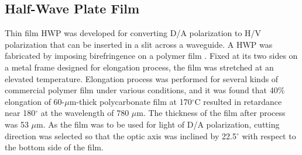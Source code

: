 \documentclass[letterpaper, 10pt]{article}
\begin{document}


\subsection{Half-Wave Plate Film}
Thin film HWP was developed for converting D/A polarization to H/V polarization that can be inserted in a slit across a waveguide.
A HWP was fabricated by imposing birefringence on a polymer film \cite{Ando:1993up}.
Fixed at its two sides on a metal frame designed for elongation process, the film was stretched at an elevated temperature.
Elongation process was performed for several kinds of commercial polymer film under various conditions, and it was found that 40\% elongation of 60-$\mu$m-thick polycarbonate film at 170$^\circ$C resulted in retardance near 180$^\circ$ at the wavelength of 780 $\mu$m.
The thickness of the film after process was 53 $\mu$m.
As the film was to be used for light of D/A polarization, cutting direction was selected so that the optic axis was inclined by 22.5$^\circ$ with respect to the bottom side of the film.
\end{document}
